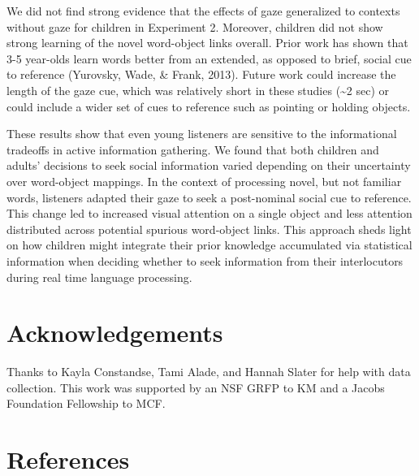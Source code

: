 \documentclass[10pt, letterpaper]{article}
\begin{document}
We did not find strong evidence that the effects of gaze generalized to
contexts without gaze for children in Experiment 2. Moreover, children
did not show strong learning of the novel word-object links overall.
Prior work has shown that 3-5 year-olds learn words better from an
extended, as opposed to brief, social cue to reference (Yurovsky, Wade,
\& Frank, 2013). Future work could increase the length of the gaze cue,
which was relatively short in these studies (\textasciitilde{}2 sec) or
could include a wider set of cues to reference such as pointing or
holding objects.

These results show that even young listeners are sensitive to the
informational tradeoffs in active information gathering. We found that
both children and adults' decisions to seek social information varied
depending on their uncertainty over word-object mappings. In the context
of processing novel, but not familiar words, listeners adapted their
gaze to seek a post-nominal social cue to reference. This change led to
increased visual attention on a single object and less attention
distributed across potential spurious word-object links. This approach
sheds light on how children might integrate their prior knowledge
accumulated via statistical information when deciding whether to seek
information from their interlocutors during real time language
processing.

\vspace{1em}

\vspace{1em}

\hypertarget{acknowledgements}{%
\section{Acknowledgements}\label{acknowledgements}}

Thanks to Kayla Constandse, Tami Alade, and Hannah Slater for help with
data collection. This work was supported by an NSF GRFP to KM and a
Jacobs Foundation Fellowship to MCF.

\hypertarget{references}{%
\section{References}\label{references}}
\end{document}

